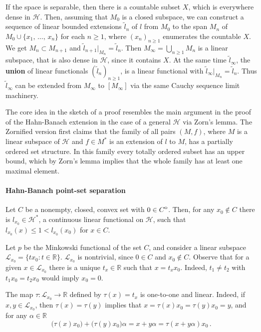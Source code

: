 \documentclass[a4paper]{article}
\newcommand{\Hcal}{\mathcal{H}}
\newcommand{\real}{\mathbb{R}}
\newcommand{\interior}[1]{%
  {\kern0pt#1}^{\mathrm{o}}%
}
\newcommand{\Lcal}{\mathcal{L}}
\begin{document}
If the space is separable, then there is a countable subset $X$, which is everywhere
dense in $\Hcal$. Then, assuming that $M_0$ is a closed subspace, we can construct
a sequence of linear bounded extensions $\tilde{l}_n$ of $l$ from $M_0$ to the span
$M_n$ of $M_0 \cup \{x_1,\,\ldots, \,x_n\}$ for each $n\geq 1$, where $(x_n)_{n\geq1}$
enumerates the countable $X$. We get $M_n\subset M_{n+1}$ and $\tilde{l}_{n+1}\big\vert_{M_n}
= \tilde{l}_{n}$. Then $M_\infty = \bigcup_{n\geq1} M_n$ is a linear subspace, that
is also dense in $\Hcal$, since it contains $X$. At the same time $\tilde{l}_\infty$,
the {\bf union} of linear functionals $(\tilde{l}_n)_{n\geq1}$, is a linear functional
with $\tilde{l}_\infty\big\vert_{M_n} = \tilde{l}_{n}$. Thus $\tilde{l}_\infty$ can
be extended from $M_\infty$ to $[M_\infty]$ via the same Cauchy sequence limit machinery.

The core idea in the sketch of a proof resembles the main argument in the proof
of the Hahn-Banach extension in the case of a general $\Hcal$ via Zorn's lemma. The
Zornified version first claims that the family of all pairs $(M, f)$, where $M$ is
a linear subspace of $\Hcal$ and $f\in M^*$ is an extension of $l$ to $M$, has a
partially ordered set structure. In this family every totally ordered subset has
an upper bound, which by Zorn's lemma implies that the whole family has at least
one maximal element.


\paragraph{Hahn-Banach point-set separation} %
\label{par:hahn_banach_point_set_separation}

Let $C$ be a nonempty, closed, convex set with $0\in \interior{C}$. Then, for any
$x_0\notin C$ there is $l_{x_0} \in \Hcal^*$, a continuous linear functional on
$\Hcal$, such that $l_{x_0}(x) \leq 1 < l_{x_0}(x_0)$ for $x\in C$.

Let $p$ be the Minkowski functional of the set $C$, and consider a linear subspace
$\Lcal_{x_0} = \{t x_0\colon t\in \real\}$. $\Lcal_{x_0}$ is nontrivial, since $0\in C$
and $x_0\notin C$. Observe that for a given $x\in \Lcal_{x_0}$ there is a unique
$t_x \in \real$ such that $x = t_x x_0$. Indeed, $t_1\neq t_2$ with $t_1 x_0 = t_2 x_0$
would imply $x_0 = 0$.

The map $\tau\colon \Lcal_{x_0} \to \real$ defined by $\tau(x) = t_x$ is one-to-one
and linear. Indeed, if $x, y\in \Lcal_{x_0}$, then $\tau(x) = \tau(y)$ implies that
$x = \tau(x) x_0 = \tau(y) x_0 = y$, and for any $\alpha\in \real$
\begin{equation*}
  \bigl( \tau(x) x_0 \bigr) + \bigl( \tau(y) x_0 \bigr) \alpha
    = x + y \alpha
    = \tau(x + y \alpha) x_0
  \,.
\end{equation*}
\end{document}
